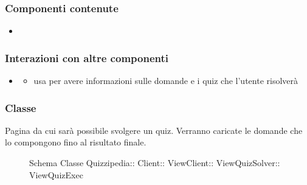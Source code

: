 \subsubsection{Componenti contenute}
\begin{itemize}
\item {}
\end{itemize}
\subsubsection{Interazioni con altre componenti}
\begin{itemize}
\item {}
\begin{itemize}
\item usa  per avere informazioni sulle domande e i quiz che l'utente risolverà
\end{itemize}
\end{itemize}
\subsubsection{Classe }
Pagina da cui sarà possibile svolgere un quiz. Verranno caricate le domande che lo compongono fino al risultato finale.
\begin{figure}[H]
\centering
\noindent{}
\caption[Schema Classe ViewQuizExec]{Schema Classe Quizzipedia:: Client:: ViewClient:: ViewQuizSolver:: ViewQuizExec}
\end{figure}
